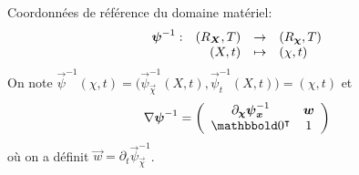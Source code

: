 \documentclass[11pt,a4paper]{article}
\begin{document}
Coordonnées de référence du domaine matériel:
$$ 
\begin{array}{rrcl}
\boldsymbol{\psi}^{-1}: & (R_{\boldsymbol{X}}, T) & \rightarrow & \left(R_{\boldsymbol{\chi}}, T\right) \\
& (X, t) &  \mapsto & (\chi , t)
\end{array}
$$
%
On note $\vec{\psi}^{-1}(\chi, t) = \Big(\vec{\psi}^{-1}_{\vec \chi}(X, t), \vec{\psi}^{-1}_{t}(X, t) \Big)=(\chi , t)$ et
%
$$
\nabla\vec {\psi}^{-1}
=
\left(
\begin{array}{cc}
\partial_{\vec \chi} \vec{\psi}^{-1}_{\vec x} & \vec{w}\\
\zeros^\T & 1
\end{array}
\right)
$$%
%
où on a définit $\vec{w} = \partial_{ t} \vec{\psi}^{-1}_{\vec \chi}  $.
%
%
%
\end{document}
